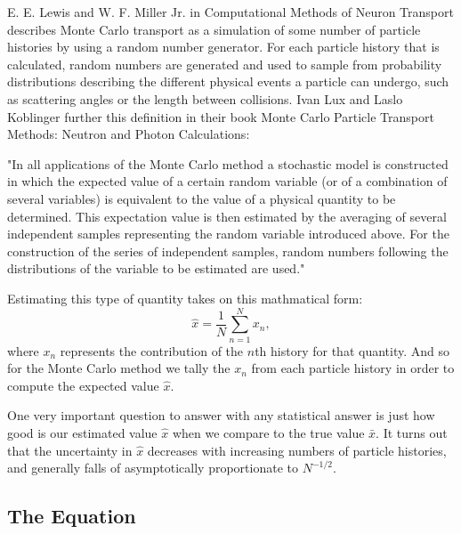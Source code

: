 E. E. Lewis and W. F. Miller Jr. in Computational Methods of Neuron Transport describes Monte Carlo transport as a simulation of some number of particle histories by using a random number generator.
%
For each particle history that is calculated, random numbers are generated and used to sample from probability distributions describing the different physical events a particle can undergo, such as scattering angles or the length between collisions.
%
Ivan Lux and Laslo Koblinger further this definition in their book Monte Carlo Particle Transport Methods: Neutron and Photon Calculations:
%
\begin{displayquote}
"In all applications of the Monte Carlo method a stochastic model is constructed in which the expected value of a certain random variable (or of a combination of several variables) is equivalent to the value of a physical quantity to be determined. This expectation value is then estimated by the averaging of several independent samples representing the random variable introduced above. For the construction of the series of independent samples, random numbers following the distributions of the variable to be estimated are used." ~\cite{LuxMCPTM}
\end{displayquote}

% 
Estimating this type of quantity takes on this mathmatical form:
$$ \hat{x} = \frac{1}{N} \sum_{n=1}^{N} x_{n}, $$
where $x_{n}$ represents the contribution of the $n$th history for that quantity.
%
And so for the Monte Carlo method we tally the $x_{n}$ from each particle history in order to compute the expected value $\hat{x}$. ~\cite{LewisCMNT}
%

%
One very important question to answer with any statistical answer is just how good is our estimated value $\hat{x}$ when we compare to the true value $\bar{x}$.
%
It turns out that the uncertainty in $\hat{x}$ decreases with increasing numbers of particle histories, and generally falls of asymptotically proportionate to $N^{-1/2}$. ~\cite{LewisCMNT}
%

\subsection{The Equation}

